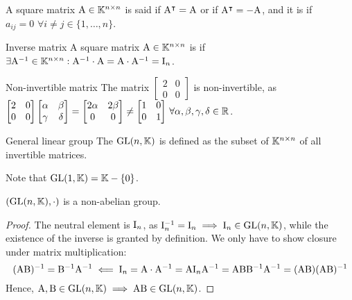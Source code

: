 A square matrix $ \mathrm{A} \in \mathbb{K}^{n \times n} $ is said  if $ \mathrm{A}^\intercal = \mathrm{A} $ or  if $ \mathrm{A}^\intercal = - \mathrm{A} $, and it is  if $ a_{ij} = 0 \,\,\forall i \neq j \in \{1, \dots, n\} $.

\begin{definition}{Inverse matrix}{}
  A square matrix $ \mathrm{A} \in \mathbb{K}^{n \times n} $ is  if $ \exists \mathrm{A}^{-1} \in \mathbb{K}^{n \times n} : \mathrm{A}^{-1} \cdot \mathrm{A} = \mathrm{A} \cdot \mathrm{A}^{-1} = \mathrm{I}_n $.
\end{definition}

\begin{example}{Non-invertible matrix}{}
  The matrix $ \begin{bmatrix} 2 & 0 \\ 0 & 0 \end{bmatrix} $ is non-invertible, as $ \begin{bmatrix} 2 & 0 \\ 0 & 0 \end{bmatrix} \begin{bmatrix} \alpha & \beta \\ \gamma & \delta \end{bmatrix} = \begin{bmatrix} 2 \alpha & 2 \beta \\ 0 & 0 \end{bmatrix} \neq \begin{bmatrix} 1 & 0 \\ 0 & 1 \end{bmatrix} \,\forall \alpha , \beta , \gamma , \delta \in \mathbb{R} $.
\end{example}

\begin{definition}{General linear group}{}
  The  $ \mathrm{GL}(n,\mathbb{K}) $ is defined as the subset of $ \mathbb{K}^{n \times n} $ of all invertible matrices.
\end{definition}

Note that $ \mathrm{GL}(1,\mathbb{K}) = \mathbb{K} - \{0\} $.

\begin{theorem}{}{}
  $ (\mathrm{GL}(n,\mathbb{K}) , \cdot) $ is a non-abelian group.
\end{theorem}

\begin{proofbox}
  \begin{proof}
    The neutral element is $ \mathrm{I}_n $, as $ \mathrm{I}_n^{-1} = \mathrm{I}_n \implies \mathrm{I}_n \in \mathrm{GL}(n,\mathbb{K}) $, while the existence of the inverse is granted by definition. We only have to show closure under matrix multiplication:
    \begin{equation*}
      (\mathrm{A} \mathrm{B})^{-1} = \mathrm{B}^{-1} \mathrm{A}^{-1} \impliedby \mathrm{I}_n = \mathrm{A} \cdot \mathrm{A}^{-1} = \mathrm{A} \mathrm{I}_n \mathrm{A}^{-1} = \mathrm{A} \mathrm{B} \mathrm{B}^{-1} \mathrm{A}^{-1} = (\mathrm{A} \mathrm{B}) (\mathrm{A} \mathrm{B})^{-1}
    \end{equation*}
    Hence, $ \mathrm{A} , \mathrm{B} \in \mathrm{GL}(n,\mathbb{K}) \implies \mathrm{A} \mathrm{B} \in \mathrm{GL}(n,\mathbb{K}) $.
  \end{proof}
\end{proofbox}

